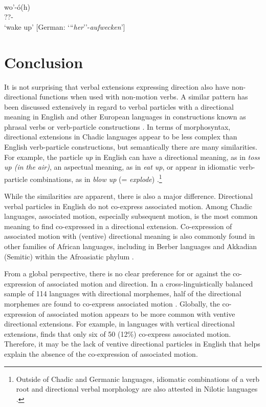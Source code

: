  \ea\label{ex:shaa4}
  \\
 \gll wo'-ó(h) \\
 ??- \\
 \glt `wake up' [German: `{``}\textit{her}''-\textit{aufwecken}']
 \z 

\section{Conclusion}

It is not surprising that verbal extensions expressing direction also have non-directional functions when used with non-motion verbs. A similar pattern has been discussed extensively in regard to verbal particles with a directional meaning in English and other European languages in constructions known as phrasal verbs or verb-particle constructions \citep{deheVerbparticleExplorations2002,luoParticleVerbsEnglish2019}. In terms of morphosyntax, directional extensions in Chadic languages appear to be less complex than English verb-particle constructions, but semantically there are many similarities. For example, the particle \textit{up} in English can have a directional meaning, as in \textit{toss up (in the air)}, an aspectual meaning, as in \textit{eat up}, or appear in idiomatic verb-particle combinations, as in \textit{blow up} (= \textit{explode}) \citep{jackendoffEnglishParticleConstructions2002}.\footnote{Outside of Chadic and Germanic languages, idiomatic combinations of a verb root and directional verbal morphology are also attested in Nilotic languages \citep[728]{payneExtensionAssociatedMotion2021}.}

While the similarities are apparent, there is also a major difference. Directional verbal particles in English do not co-express associated motion. Among Chadic languages, associated motion, especially subsequent motion, is the most common meaning to find co-expressed in a directional extension. Co-expression of associated motion with (ventive) directional meaning is also commonly found in other families of African languages, including in Berber languages and Akkadian (Semitic) within the Afroasiatic phylum \citep{belkadiAssociatedMotionDeictic2015,kovalAssociatedMotionOld2024}.

From a global perspective, there is no clear preference for or against the co-expression of associated motion and direction. In a cross-linguistically balanced sample of 114 languages with directional morphemes, half of the directional morphemes are found to co-express associated motion \citep{rossCrosslinguisticSurveyAssociated2021,rossPseudocoordinationSerialVerb2021}. Globally, the co-expression of associated motion appears to be more common with ventive directional extensions. For example, in languages with vertical directional extensions, \citet[281]{rossPseudocoordinationSerialVerb2021} finds that only six of 50 (12\%) co-express associated motion. Therefore, it may be the lack of ventive directional particles in English that helps explain the absence of the co-expression of associated motion. 

